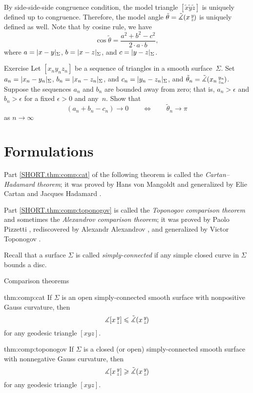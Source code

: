 By side-side-side congruence condition,
the model triangle $[\tilde x\tilde y\tilde z]$ is uniquely defined up to congruence.
Therefore, the model angle $\tilde\theta=\tilde\measuredangle(x\,{}^{y}_{z}\hspace{-0.2ex})$ is uniquely defined as well.
Note that by cosine rule, we have 
\[\cos \tilde\theta=\frac{a^2+b^2-c^2}{2\cdot a \cdot b},\]
where $a=\dist{x}{y}{\Sigma}$, $b=\dist{x}{z}{\Sigma}$, and $c=\dist{y}{z}{\Sigma}$.

\begin{thm}{Exercise}\label{ex:wide-hinges}
Let $[x_ny_nz_n]$ be a sequence of triangles in a smooth surface~$\Sigma$.
Set $a_n=\dist{x_n}{y_n}{\Sigma}$,
$b_n=\dist{x_n}{z_n}{\Sigma}$,
and $c_n=\dist{y_n}{z_n}{\Sigma}$, and $\tilde\theta_n=\tilde\measuredangle(x_n\,{}^{y_n}_{z_n}\hspace{-0.2ex})$.
Suppose the sequences $a_n$ and $b_n$ are bounded away from zero;
that is, $a_n>\epsilon$ and $b_n>\epsilon$ for a fixed $\epsilon>0$ and any~$n$.
Show that
\[(a_n+b_n-c_n)\to 0\qquad\iff\qquad \tilde\theta_n\to \pi\]
as $n\to\infty$
\end{thm}

\section{Formulations}

Part \ref{SHORT.thm:comp:cat} of the following theorem is called the {}\emph{Cartan--Hadamard theorem};
it was proved by 
Hans von Mangoldt \cite{mangoldt} and generalized by 
Elie Cartan \cite{cartan} and
Jacques Hadamard \cite{hadamard}.

Part \ref{SHORT.thm:comp:toponogov} is called the {}\emph{Toponogov comparison theorem} and sometimes the {}\emph{Alexandrov comparison theorem};
it was proved by Paolo Pizzetti \cite{pizzetti}, rediscovered by Alexandr Alexandrov \cite{aleksandrov}, and 
generalized by Victor Toponogov \cite{toponogov1957}.%

Recall that a surface $\Sigma$ is called \emph{simply-connected} if any simple closed curve in $\Sigma$ bounds a disc.

\begin{thm}{Comparison theorems}
\label{thm:comp}
\ 

\begin{subthm}{thm:comp:cat}
If $\Sigma$ is an open simply-connected  smooth surface with nonpositive Gauss curvature, then 
\[\measuredangle[x\,{}^{y}_{z}]\leqslant\tilde\measuredangle(x\,{}^{y}_{z}\hspace{-0.2ex})\]
for any geodesic triangle $[xyz]$.
\end{subthm}

\begin{subthm}{thm:comp:toponogov}
If $\Sigma$ is a closed (or open) simply-connected smooth surface with nonnegative Gauss curvature, then 
 \[\measuredangle[x\,{}^{y}_{z}]\geqslant\tilde\measuredangle(x\,{}^{y}_{z}\hspace{-0.2ex})\]
for any geodesic triangle $[xyz]$.
\end{subthm}

\end{thm}

